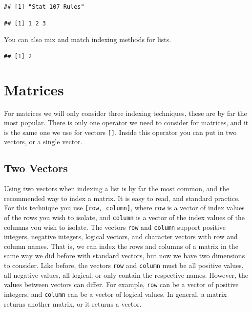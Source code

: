 \documentclass[
]{book}
\newenvironment{Shaded}{\begin{snugshade}}{\end{snugshade}}
\newcommand{\CommentTok}[1]{\textcolor[rgb]{0.56,0.35,0.01}{\textit{#1}}}
\newcommand{\DecValTok}[1]{\textcolor[rgb]{0.00,0.00,0.81}{#1}}
\newcommand{\NormalTok}[1]{#1}
\newcommand{\OperatorTok}[1]{\textcolor[rgb]{0.81,0.36,0.00}{\textbf{#1}}}
\begin{document}
\begin{verbatim}
## [1] "Stat 107 Rules"
\end{verbatim}

\begin{Shaded}
\end{Shaded}

\begin{verbatim}
## [1] 1 2 3
\end{verbatim}

You can also mix and match indexing methods for lists.

\begin{Shaded}
\end{Shaded}

\begin{verbatim}
## [1] 2
\end{verbatim}

\hypertarget{matrices-1}{%
\section{Matrices}\label{matrices-1}}

For matrices we will only consider three indexing techniques, these are by far the most popular. There is only one operator we need to consider for matrices, and it is the same one we use for vectors \texttt{{[}{]}}. Inside this operator you can put in two vectors, or a single vector.

\hypertarget{two-vectors}{%
\subsection{Two Vectors}\label{two-vectors}}

Using two vectors when indexing a list is by far the most common, and the recommended way to index a matrix. It is easy to read, and standard practice. For this technique you use \texttt{{[}row,\ column{]}}, where \texttt{row} is a vector of index values of the rows you wish to isolate, and \texttt{column} is a vector of the index values of the columns you wish to isolate. The vectors \texttt{row} and \texttt{column} support positive integers, negative integers, logical vectors, and character vectors with row and column names. That is, we can index the rows and columns of a matrix in the same way we did before with standard vectors, but now we have two dimensions to consider. Like before, the vectors \texttt{row} and \texttt{column} must be all positive values, all negative values, all logical, or only contain the respective names. However, the values between vectors can differ. For example, \texttt{row} can be a vector of positive integers, and \texttt{column} can be a vector of logical values. In general, a matrix returns another matrix, or it returns a vector.
\end{document}
